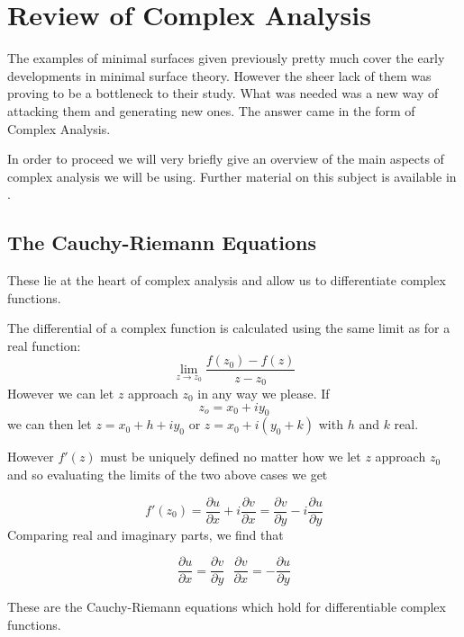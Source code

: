 \section{Review of Complex Analysis}
The examples of minimal surfaces given previously pretty much cover the early developments in minimal surface theory. However the sheer lack of them was proving to be a bottleneck to their study. What was needed was a new way of attacking them and generating new ones. The answer came in the form of Complex Analysis.

In order to proceed we will very briefly give an overview of the main aspects of complex analysis we will be using. Further material on this subject is available in \cite{BCA}.

\subsection{The Cauchy-Riemann Equations}
These lie at the heart of complex analysis and allow us to differentiate complex functions.

The differential of a complex function is calculated using the same limit as for a real function:
\begin{displaymath}
\lim_{z\rightarrow z_0}\frac{f(z_0)-f(z)}{z-z_0}
\end{displaymath}
However we can let $z$ approach $z_0$ in any way we please. If
\begin{displaymath}
z_o = x_0 + i y_0
\end{displaymath}
we can then let $z = x_0 + h + i y_0$ or $z = x_0 + i (y_0+k)$ with $h$ and $k$ real.

However $f'(z)$ must be uniquely defined no matter how we let $z$ approach $z_0$ and so evaluating the limits of the two above cases we get

\begin{displaymath}
f'(z_0) = \frac{\partial u}{\partial x} + i \frac{\partial v}{\partial x} = \frac{\partial v}{\partial y} - i \frac{\partial u}{\partial y}
\label{CR}
\end{displaymath}
Comparing real and imaginary parts, we find that

\begin{displaymath}
\frac{\partial u}{\partial x} = \frac{\partial v}{\partial y} \ \ \  \frac{\partial v}{\partial x} =  -\frac{\partial u}{\partial y}
\end{displaymath}

These are the Cauchy-Riemann equations which hold for differentiable complex functions.

